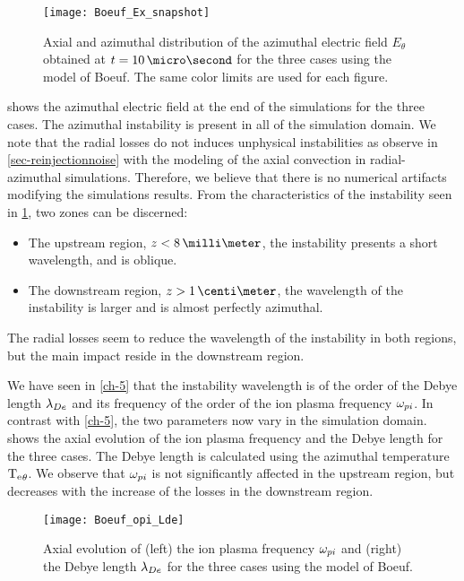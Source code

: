 \begin{figure}[hbt]
  \centering
  \texttt{[image: Boeuf\_Ex\_snapshot]}
  \caption{Axial and azimuthal distribution of the azimuthal electric field $E_{\theta}$  obtained at $t=10 \,\micro\second$ for the three cases using the model of Boeuf. The same color limits are used for each figure.}
  \label{fig-snapshots}
\end{figure}

 shows the azimuthal electric field at the end of the simulations for the three cases.
The azimuthal instability is present in all of the simulation domain.
We note that the radial losses do not induces unphysical instabilities as observe in \cref{sec-reinjectionnoise} with the modeling of the axial convection in radial-azimuthal simulations.
Therefore, we believe that there is no numerical artifacts modifying the simulations results.
From the characteristics of the instability seen in \cref{fig-snapshots}, two zones can be discerned\string:
\begin{itemize}
  \item The upstream region, $z < 8 \,\milli\meter$, the instability presents a short wavelength, and is oblique.
  \item The downstream region, $z > 1\,\centi\meter$, the wavelength of the instability is larger and is almost perfectly azimuthal.
\end{itemize}
The radial losses seem to reduce the wavelength of the instability in both regions, but the main impact reside in the downstream region.


We have seen in \cref{ch-5} that the instability wavelength is of the order of the Debye length $\lambda_{De}$ and its frequency of the order of the ion plasma frequency $\omega_{pi}$.
In contrast with \cref{ch-5}, the two parameters now vary in the simulation domain.
 shows the axial evolution of the ion plasma frequency and the Debye length for the three cases.
The Debye length is calculated using the azimuthal temperature $\mathrm{T_e}_{\theta}$.
We observe that $\omega_{pi}$ is not significantly affected in the upstream region, but decreases with the increase of the losses in the downstream region.

\begin{figure}[hbt]
  \centering
  \texttt{[image: Boeuf\_opi\_Lde]}
  \caption{Axial evolution of (left) the ion plasma frequency $\omega_{pi}$ and (right) the Debye length $\lambda_{De}$ for the three cases using the model of Boeuf.}
  \label{fig-wpi_Lde}
\end{figure}



